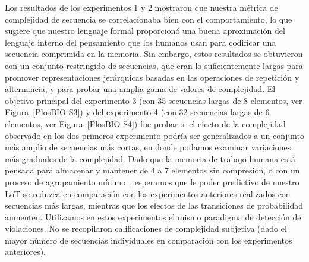 Los resultados de los experimentos 1 y 2 mostraron que nuestra métrica de complejidad de secuencia se correlacionaba bien con el comportamiento, lo que sugiere que nuestro lenguaje formal proporcionó una buena aproximación del lenguaje interno del pensamiento que los humanos usan para codificar una secuencia comprimida en la memoria. Sin embargo, estos resultados se obtuvieron con un conjunto restringido de secuencias, que eran lo suficientemente largas para promover representaciones jerárquicas basadas en las operaciones de repetición y alternancia, y para probar una amplia gama de valores de complejidad. El objetivo principal del experimento 3 (con 35 secuencias largas de 8 elementos, ver Figura~\ref{PlosBIO-S3}) y del experimento 4 (con 32 secuencias largas de 6 elementos, ver Figura~\ref{PlosBIO-S4}) fue probar si el efecto de la complejidad observado en los dos primeros experimento podría ser generalizados a un conjunto más amplio de secuencias más cortas, en donde podamos examinar variaciones más graduales de la complejidad. Dado que la memoria de trabajo humana está pensada para almacenar y mantener de 4 a 7 elementos sin compresión, o con un proceso de agrupamiento mínimo~\cite{f25,f29}, esperamos que le poder predictivo de nuestro LoT se reduzca en comparación con los experimentos anteriores realizados con secuencias más largas, mientras que los efectos de las transiciones de probabilidad aumenten. Utilizamos en estos experimentos el mismo paradigma de detección de violaciones. No se recopilaron calificaciones de complejidad subjetiva (dado el mayor número de secuencias individuales en comparación con los experimentos anteriores).


